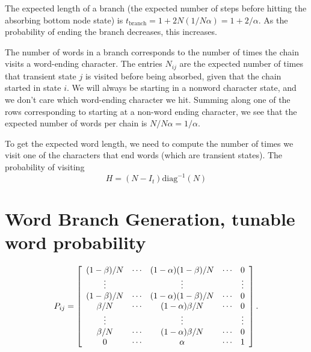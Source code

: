 \documentclass[11pt]{article}
\begin{document}
The expected length of a branch (the expected number of steps before hitting the absorbing bottom node state) is $t_\textrm{branch}=1+2N(1/N\alpha)=1+2/\alpha$. As the probability of ending the branch decreases, this increases.

The number of words in a branch corresponds to the number of times the chain visits a word-ending character. The entries $N_{ij}$ are the expected number of times that transient state $j$ is visited before being absorbed, given that the chain started in state $i$. We will always be starting in a nonword character state, and we don't care which word-ending character we hit. Summing along one of the rows corresponding to starting at a non-word ending character, we see that the expected number of words per chain is $N/N\alpha = 1/\alpha$.

To get the expected word length, we need to compute the number of times we visit one of the characters that end words (which are transient states). The probability of visiting 
\begin{equation}
H = (N-I_t)\textrm{diag}^{-1}(N)
\end{equation}

\section{Word Branch Generation, tunable word probability}

\begin{equation}
P_{ij}=\left[\begin{array}{c c c c c c}
(1-\beta)/N&\cdots & (1-\alpha)(1-\beta)/N & \cdots & 0\\
 \vdots & & \vdots & & \vdots\\
(1-\beta)/N & \cdots & (1-\alpha)(1-\beta)/N & \cdots & 0\\
\beta/N & \cdots & (1-\alpha)\beta/N & \cdots & 0\\
\vdots & & \vdots & & \vdots\\
\beta/N & \cdots & (1-\alpha)\beta/N & \cdots & 0\\
0 & \cdots & \alpha & \cdots & 1
\end{array}
\right].
\end{equation}
\end{document}
